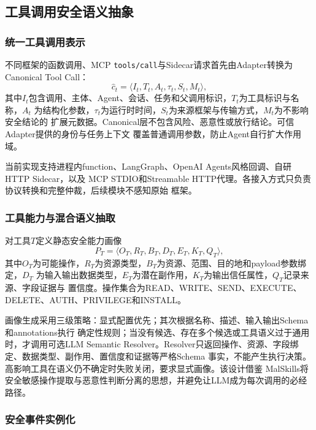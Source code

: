 \subsection{工具调用安全语义抽象}
\label{subsec:event-abstraction}

\subsubsection{统一工具调用表示}

不同框架的函数调用、MCP \texttt{tools/call}与Sidecar请求首先由Adapter转换为
Canonical Tool Call：
\begin{equation}
\hat{c}_t=\langle I_t,T_t,A_t,\tau_t,S_t,M_t\rangle,
\label{eq:canonical-call}
\end{equation}
其中$I_t$包含调用、主体、Agent、会话、任务和父调用标识，$T_t$为工具标识与名称，$A_t$
为结构化参数，$\tau_t$为运行时时间，$S_t$为来源框架与传输方式，$M_t$为不影响安全结论的
扩展元数据。Canonical层不包含风险、恶意性或放行结论。可信Adapter提供的身份与任务上下文
覆盖普通调用参数，防止Agent自行扩大作用域。

当前实现支持进程内function、LangGraph、OpenAI Agents风格回调、自研HTTP Sidecar，以及
MCP STDIO和Streamable HTTP代理。各接入方式只负责协议转换和完整仲裁，后续模块不感知原始
框架。

\subsubsection{工具能力与混合语义抽取}

对工具$T$定义静态安全能力画像
\begin{equation}
P_T=\langle O_T,R_T,B_T,D_T,E_T,K_T,Q_T\rangle,
\label{eq:tool-profile}
\end{equation}
其中$O_T$为可能操作，$R_T$为资源类型，$B_T$为资源、范围、目的地和payload参数绑定，$D_T$
为输入输出数据类型，$E_T$为潜在副作用，$K_T$为输出信任属性，$Q_T$记录来源、字段证据与
置信度。操作集合为READ、WRITE、SEND、EXECUTE、DELETE、AUTH、PRIVILEGE和INSTALL。

画像生成采用三级策略：显式配置优先；其次根据名称、描述、输入输出Schema和annotations执行
确定性规则；当没有候选、存在多个候选或工具语义过于通用时，才调用可选LLM Semantic
Resolver。Resolver只返回操作、资源、字段绑定、数据类型、副作用、置信度和证据等严格Schema
事实，不能产生执行决策。高影响工具在语义仍不确定时失败关闭，要求显式画像。该设计借鉴
MalSkills将安全敏感操作提取与恶意性判断分离的思想，并避免让LLM成为每次调用的必经路径。

\subsubsection{安全事件实例化}


